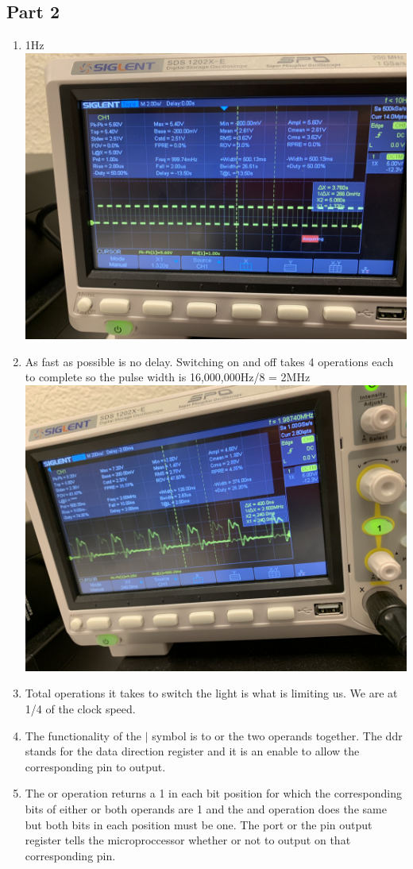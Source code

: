 \documentclass[]{article}
\begin{document}
\subsection*{Part 2}
\begin{enumerate}
	\item 1Hz\\
	\includegraphics[scale=.1]{images/2-1.jpg}\pagebreak
	\item As fast as possible is no delay. Switching on and off takes 4 operations each to complete so the pulse width is 16,000,000Hz/8 = 2MHz\\
	\includegraphics[scale=.1]{images/2-2.jpg}\pagebreak
	\item Total operations it takes to switch the light is what is limiting us. We are at 1/4 of the clock speed.
	\item The functionality of the $|$ symbol is to or the two operands together. The ddr stands for the data direction register and it is an enable to allow the corresponding pin to output.
	\item The or operation returns a 1 in each bit position for which the corresponding bits of either or both operands are 1 and the and operation does the same but both bits in each position must be one. The port or the pin output register tells the microproccessor whether or not to output on that corresponding pin.
\end{enumerate}
\end{document}
